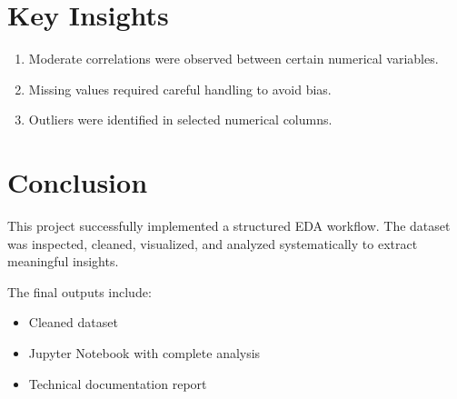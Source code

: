 \documentclass[12pt]{article}
\begin{document}
	\section{Key Insights}
	
	\begin{enumerate}[leftmargin=1.5cm]
		\item Moderate correlations were observed between certain numerical variables.
		\item Missing values required careful handling to avoid bias.
		\item Outliers were identified in selected numerical columns.
	\end{enumerate}
	
	\section{Conclusion}
	
	This project successfully implemented a structured EDA workflow. The dataset was inspected, cleaned, visualized, and analyzed systematically to extract meaningful insights.
	
	The final outputs include:
	\begin{itemize}[leftmargin=1.5cm]
		\item Cleaned dataset
		\item Jupyter Notebook with complete analysis
		\item Technical documentation report
	\end{itemize}
	
\end{document}
